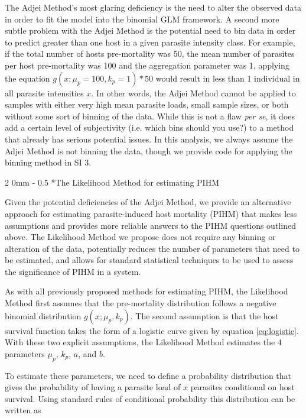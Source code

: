 \documentclass[12pt, a4paper]{article}
\makeatletter
\renewcommand{\subsection}{\@startsection
{subsection}%
{2}%
{0mm}%
{-\baselineskip}%
{0.5\baselineskip}%
{\normalfont\bf}} %
\makeatother
\begin{document}
The Adjei Method's most glaring deficiency is the need to alter the observed
data in order to fit the model into the binomial GLM framework.  A second more
subtle problem with the Adjei Method is the potential need to bin data in order
to predict greater than one host in a given parasite intensity class.  For
example, if the total number of hosts pre-mortality was 50, the mean number of
parasites per host pre-mortality was 100 and the aggregation parameter was 1, applying the equation $g(x ; \mu_p=100, k_p=1) * 50$ would result in
less than 1 individual in all parasite intensities $x$. In other words, the
Adjei Method cannot be applied to samples with either very high mean parasite
loads, small sample sizes, or both without some sort of binning of the data.
While this is not a flaw \emph{per se}, it does add a certain level of
subjectivity (i.e. which bins should you use?) to a method that already has
serious potential issues.  In this analysis, we always assume the Adjei Method is not binning the data, though we provide code for applying the binning method in SI 3.

\subsection*{The Likelihood Method for estimating PIHM}

Given the potential deficiencies of the Adjei Method, we provide an alternative
approach for estimating parasite-induced host mortality (PIHM) that makes less
assumptions and provides more reliable answers to the PIHM questions outlined above.  The Likelihood Method we propose
does not require any binning or alteration of the data, potentially reduces the
number of parameters that need to be estimated, and allows for standard
statistical techniques to be used to assess the significance of PIHM in a
system.

As with all previously proposed methods for estimating PIHM, the
Likelihood Method first assumes that the pre-mortality distribution follows a
negative binomial distribution $g(x; \mu_p, k_p)$.  The second
assumption is that the host survival function
takes the form of a logistic curve given by equation \ref{eq:logistic}.  With these two explicit assumptions, the Likelihood Method estimates the 4 parameters $\mu_p$, $k_p$, $a$, and $b$.

To estimate these parameters, we need to define a probability distribution that gives the probability of having a parasite load of $x$ parasites conditional on host survival.  Using standard rules of conditional probability this distribution can be written as
\end{document}
